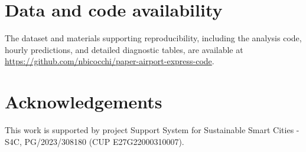 \documentclass[preprint,12pt,times]{elsarticle}
\begin{document}
\section*{Data and code availability}
The dataset and materials supporting reproducibility, including the analysis code, hourly predictions, and detailed diagnostic tables, are available at \url{https://github.com/nbicocchi/paper-airport-express-code}.

\section*{Acknowledgements}
This work is supported by project Support System for Sustainable Smart Cities - S4C, PG/2023/308180 (CUP E27G22000310007).



\end{document}

